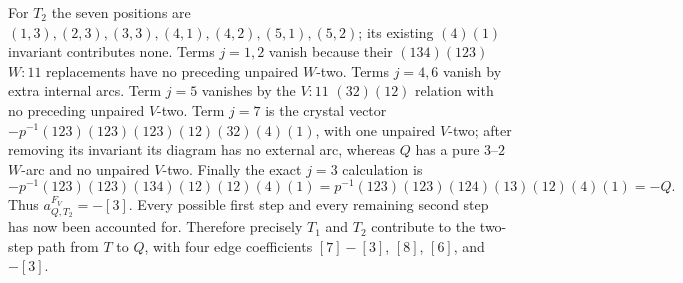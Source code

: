 For $T_2$ the seven positions are
$(1,3),(2,3),(3,3),(4,1),(4,2),(5,1),(5,2)$; its existing
$(4)(1)$ invariant contributes none. Terms $j=1,2$ vanish because
their $(134)(123)$ $W:11$ replacements have no preceding unpaired
$W$-two. Terms $j=4,6$ vanish by extra internal arcs. Term $j=5$
vanishes by the $V:11$ $(32)(12)$ relation with no preceding
unpaired $V$-two. Term $j=7$ is the crystal vector
$-p^{-1}(123)(123)(123)(12)(32)(4)(1)$, with one unpaired
$V$-two; after removing its invariant its diagram has no external
arc, whereas $Q$ has a pure $3$--$2$ $W$-arc and no unpaired
$V$-two. Finally the exact $j=3$ calculation is
\[
 -p^{-1}(123)(123)(134)(12)(12)(4)(1)
 =p^{-1}(123)(123)(124)(13)(12)(4)(1)=-Q.
\]
Thus $a^{F_V}_{Q,T_2}=-[3]$. Every possible first step and every
remaining second step has now been accounted for. Therefore precisely
$T_1$ and $T_2$ contribute to the two-step path from $T$ to $Q$,
with four edge coefficients $[7]-[3]$, $[8]$, $[6]$, and $-[3]$.
